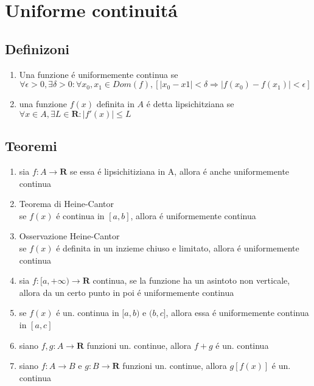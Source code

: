 \documentclass{exam}
\begin{document}
\section{Uniforme continuit\'a}
  \subsection{Definizoni}
    \begin{enumerate}
      \item
        Una funzione \'e uniformemente continua se
        \begin{equation}
         \forall \epsilon >0, \exists \delta >0 : \forall x_{0},x_{1} \in Dom(f),[|x_{0}-x{1}|<\delta \Rightarrow |f(x_{0})-f(x_{1})|<\epsilon]
        \end{equation}
      \item
       una funzione $f(x)$ definita in $A$ \'e detta lipsichitziana se $ \forall x\in A,\exists L\in \mathbf{R}:|f'(x)|\le L$
  \end{enumerate}


  \subsection{Teoremi}
    \begin{enumerate}
      \item
        sia $f:A\rightarrow \mathbf{R}$ se essa \'e lipsichitiziana in A, allora \'e anche uniformemente continua
      \item{Teorema di Heine-Cantor}\\
        se $f(x)$ \'e continua in $[a,b]$, allora \'e uniformemente continua
      \item{Osservazione Heine-Cantor}\\
        se $f(x)$ \'e definita in un inzieme chiuso e limitato, allora \'e uniformemente continua
      \item
        sia $f:[a,+\infty)\rightarrow \mathbf{R}$ continua, se la funzione ha un asintoto non verticale, allora da un certo punto in poi \'e uniformemente continua
      \item
        se $f(x)$ \'e un. continua in $[a,b)$ e $(b,c]$, allora essa \'e uniformemente continua in $[a,c]$
      \item
        siano $f,g:A\rightarrow \mathbf{R}$ funzioni un. continue, allora $f+g$ \'e un. continua
      \item
        siano $f:A\rightarrow B$ e $g:B\rightarrow \mathbf{R}$ funzioni un. continue, allora $g[f(x)]$ \'e un. continua
    \end{enumerate}    
  \newpage
\end{document}
